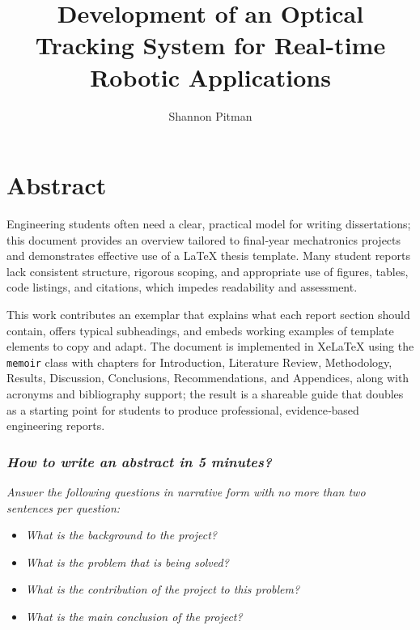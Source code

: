 \documentclass[11pt,a4paper,oneside]{memoir} %
\title{Development of an Optical Tracking System for Real-time Robotic Applications} %
\author{Shannon Pitman}
\date{}
\begin{document}
\begin{titlingpage}
\maketitle %
\end{titlingpage}

\frontmatter %


\chapter*{Abstract}

Engineering students often need a clear, practical model for writing dissertations; this document provides an overview tailored to final‑year mechatronics projects and demonstrates effective use of a LaTeX thesis template. Many student reports lack consistent structure, rigorous scoping, and appropriate use of figures, tables, code listings, and citations, which impedes readability and assessment.

This work contributes an exemplar that explains what each report section should contain, offers typical subheadings, and embeds working examples of template elements to copy and adapt. The document is implemented in XeLaTeX using the \texttt{memoir} class with chapters for Introduction, Literature Review, Methodology, Results, Discussion, Conclusions, Recommendations, and Appendices, along with acronyms and bibliography support; the result is a shareable guide that doubles as a starting point for students to produce professional, evidence‑based engineering reports.
\vspace*{1cm}

\subsection*{\emph{How to write an abstract in 5 minutes?}}

\begin{flushright}
\textit{Answer the following questions in narrative form with no more than two sentences per question:}

\begin{itemize}
    \item \textit{What is the background to the project?}
    \item \textit{What is the problem that is being solved?}
    \item \textit{What is the contribution of the project to this problem?}
    \item \textit{What is the main conclusion of the project?}
\end{itemize}
\end{flushright}
\end{document}
